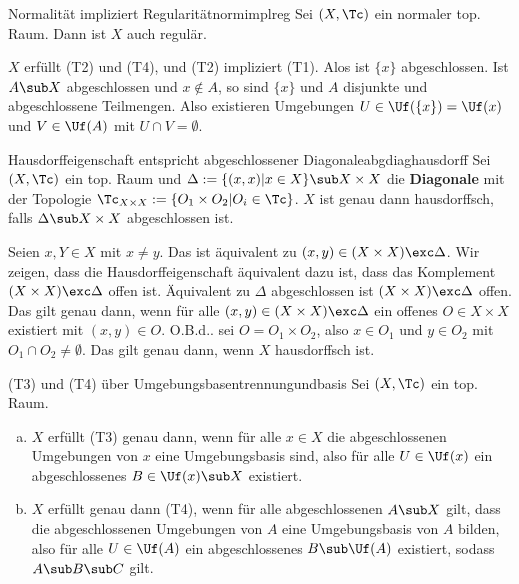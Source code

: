 \begin{satz}{Normalität impliziert Regularität}{normimplreg}
Sei $(X, \Tc)$ ein normaler top. Raum. Dann ist $X$ auch regulär.
\end{satz}
\begin{beweis}
$X$ erfüllt (T2) und (T4), und (T2) impliziert (T1). Alos ist $\{x\}$ abgeschlossen. Ist $A \sub X$ abgeschlossen und $x \notin A$, so sind $\{x\}$ und $A$ disjunkte und abgeschlossene Teilmengen. Also existieren Umgebungen $U \in \Uf(\{x\}) = \Uf(x)$ und $V \in \Uf(A)$ mit $U \cap V = \emptyset$.
\end{beweis}
\begin{satz}{Hausdorffeigenschaft entspricht abgeschlossener Diagonale}{abgdiaghausdorff}
Sei $(X, \Tc)$ ein top. Raum und $\Delta:= \{(x,x)|x \in X\} \sub X \times X$ die \textbf{Diagonale} mit der Topologie $\Tc_{X \times X} := \{O_1 \times O_2 | O_i \in \Tc\}$. $X$ ist genau dann hausdorffsch, falls $\Delta \sub X \times X$ abgeschlossen ist.
\end{satz}
\begin{beweis}
Seien $x, Y \in X$ mit $x \neq y$. Das ist äquivalent zu $(x,y) \in (X \times X) \exc \Delta$. Wir zeigen, dass die Hausdorffeigenschaft äquivalent dazu ist, dass das Komplement $(X \times X) \exc \Delta$ offen ist. Äquivalent zu $\Delta$ abgeschlossen ist $(X \times X) \exc \Delta$ offen. Das gilt genau dann, wenn für alle $(x,y) \in (X \times X) \exc \Delta$ ein offenes $O \in X \times X$ existiert mit $(x,y)\in O$. O.B.d.. sei $O = O_1 \times O_2$, also $x \in O_1$ und $y \in O_2$ mit $O_1 \cap O_2 \neq \emptyset$. Das gilt genau dann, wenn $X$ hausdorffsch ist.
\end{beweis}
\begin{satz}{(T3) und (T4) über Umgebungsbasen}{trennungundbasis}
Sei $(X,\Tc)$ ein top. Raum.
\begin{enumerate}[(a)]
\item $X$ erfüllt (T3) genau dann, wenn für alle $x \in X$ die abgeschlossenen Umgebungen von $x$ eine Umgebungsbasis sind, also für alle $U \in \Uf(x)$ ein abgeschlossenes $B \in \Uf(x) \sub X$  existiert.
\item $X$ erfüllt genau dann (T4), wenn für alle abgeschlossenen $A \sub X$ gilt, dass die abgeschlossenen Umgebungen von $A$ eine Umgebungsbasis von $A$ bilden, also für alle $U \in \Uf(A)$ ein abgeschlossenes $B \sub \Uf(A)$ existiert, sodass $A \sub B \sub C$ gilt.
\end{enumerate}
\end{satz}
